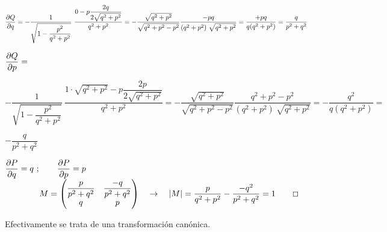 $\displaystyle \pdv{Q}{q}=
-\dfrac 
{ 1 }  
{ \sqrt{1-\dfrac{p^2}{q^2+p^2}} } \ 
\dfrac 
{0 - p\dfrac{2q}{2\sqrt{q^2+p^2}}}
{q^2+p^2} = -  
\dfrac{\sqrt{q^2+p^2}}{\sqrt{q^2+p^2-p^2}} 
\dfrac{-pq}{(q^2+p^2)\ \sqrt{q^2+p^2}} = \dfrac{+pq}{q(q^2+p^2)}=\dfrac{q}{p^2+q^2}$



$\displaystyle \pdv{Q}{p}= $
\begin{footnotesize} $-\dfrac 
{ 1 }  
{ \sqrt{1-\dfrac{p^2}{q^2+p^2}} } \ 
\dfrac 
{1\cdot \sqrt{q^2+p^2} - p\dfrac{2p}{2\sqrt{q^2+p^2}}}
{q^2+p^2} = 
-\dfrac{\sqrt{q^2+p^2}}{\sqrt{q^2+p^2-p^2}} \dfrac{q^2+p^2-p^2}{(q^2+p^2)\ \sqrt{q^2+p^2} } = -\dfrac{q^2}{q(q^2+p^2)}= $\end{footnotesize}
$ -\dfrac{q}{p^2+q^2}$




$\displaystyle \pdv{P}{q}=q \ ;  \qquad \pdv{P}{p}=p$
$ \qquad \qquad M=\mqty( \dfrac{p}{p^2+q^2} & \dfrac{-q}{p^2+q^2} \\ q & p )   \quad   \to \quad | M|= \dfrac {p}{q^2+p^2} - \dfrac{-q^2}{p^2+q^2} = 1 \qquad \Box$



 Efectivamente se trata de una transformación canónica.









\color{Black}


